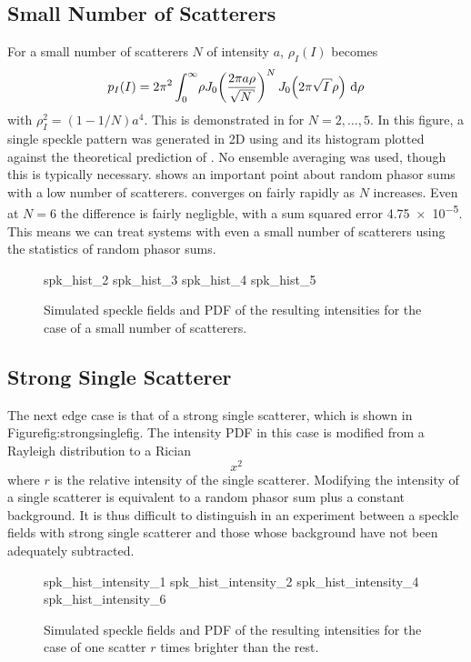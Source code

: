\subsection{Small Number of Scatterers}
For a small number of scatterers $N$ of intensity $a$, $\rho_I(I)$ becomes
\begin{equation}
p_I(I) = 2\pi^2 \int_0^\infty\! \rho J_0\!\left(\frac{2\pi a
\rho}{\sqrt{N}}\right)^N J_0\!\left(2\pi\sqrt{I}\rho\right)\md\rho
\label{eqn:smallscatteqn}
\end{equation}
with $\rho_I^2=(1-1/N)a^4$.  This is demonstrated in  for
$N=2,\ldots,5$.  In this figure, a single speckle pattern was generated in 2D
using  and its histogram plotted against the
theoretical prediction of .  No ensemble
averaging was used, though this is typically necessary.
 shows an important point about random phasor sums
with a low number of scatterers.   converges on
 fairly rapidly as $N$ increases.  Even at $N=6$ the
difference is fairly negligble, with a sum squared error \num{4.75e-5}.
This means we can treat systems with even a small number of scatterers
using the statistics of random phasor sums.
\begin{figure}[ht]
\centering
{spk_hist_2}
{spk_hist_3}
{spk_hist_4}
{spk_hist_5}
\caption{Simulated speckle fields and PDF of the resulting intensities for
the case of a small number of scatterers.}
\label{fig:lowscatthist}
\end{figure}

\subsection{Strong Single Scatterer}
The next edge case is that of a strong single scatterer, which is shown in 
Figure{fig:strongsinglefig}.  The intensity PDF in this case is modified
from a Rayleigh distribution to a Rician 
\begin{equation}
x^2
\label{ricedpf}
\end{equation}
where $r$ is the relative intensity of the single scatterer.  Modifying the
intensity of a single scatterer is equivalent to a random phasor sum plus a
constant background.  It is thus difficult to distinguish in an experiment
between a speckle fields with strong single scatterer and those whose
background have not been adequately subtracted.
\begin{figure}[ht]
\centering
{spk_hist_intensity_1}
{spk_hist_intensity_2}
{spk_hist_intensity_4}
{spk_hist_intensity_6}
\caption{Simulated speckle fields and PDF of the resulting intensities for
the case of one scatter $r$ times brighter than the rest.}
\label{fig:strongsinglefig}
\end{figure}

